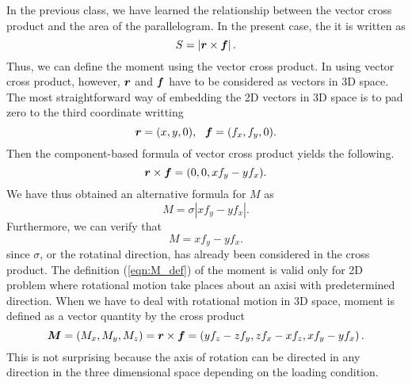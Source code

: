 \documentclass[10pt,a4j]{article}
\begin{document}
In the previous class, we have learned the relationship between the vector 
cross product and the area of the parallelogram. In the present case, the 
it is written as 
\begin{equation}
	S=\left| \mbox{\boldmath $r$} \times \mbox{\boldmath $f$} \right|.
	\label{eqn:}
\end{equation}
Thus, we can define the moment using the vector cross product. 
In using vector cross product, however, $\mbox{\boldmath $r$}$ and $\mbox{\boldmath $f$}$ have 
to be considered as vectors in 3D space. 
The most straightforward way of embedding the 2D vectors in 3D space is 
to pad zero to the third coordinate writting 
\begin{equation}
	\fat{r}=(x,y,0), \ \ 
	\fat{f}=(f_x,f_y,0).
	\label{eqn:}
\end{equation}
Then the component-based formula of vector cross product yields the following. 
\begin{equation}
	\mbox{\boldmath $r$}\times \mbox{\boldmath $f$}=(0,0,xf_y-yf_x).
\end{equation}
We have thus obtained an alternative formula for $M$ as 
\begin{equation}
	M=\sigma \left| 
		xf_y-yf_x
	\right|.
\end{equation}
Furthermore, we can verify that 
\begin{equation}
	M=xf_y-yf_x.
\end{equation}
since $\sigma$, or the rotatinal direction, has already been considered in the cross product.
The definition (\ref{eqn:M_def}) of the moment is valid only for 2D problem where 
rotational motion take places about an axisi with  predetermined direction. 
When we have to deal with rotational motion in 3D space, moment is defined as a vector 
quantity by the cross product
\begin{equation}
	\mbox{\boldmath $M$}=(M_x, M_y, M_z)=
	\mbox{\boldmath $r$}\times\mbox{\boldmath $f$}
	=
	\left(
		yf_z-zf_y
	,
		zf_x-xf_z
	,
		xf_y-yf_x
	\right).
	\label{eqn:}
\end{equation}
This is not surprising because the axis of rotation can be directed in 
any direction in the three dimensional space depending on the loading condition. 
\end{document}
